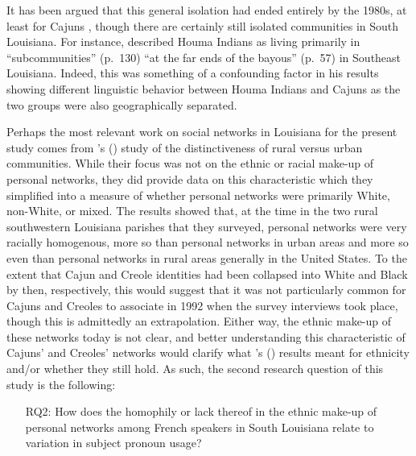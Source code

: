 \documentclass{article}\usepackage[]{graphicx}\usepackage[]{xcolor}
\begin{document}
    It has been argued that this general isolation had ended entirely by the 1980s, at least for Cajuns \parencite[Esman, 1985, as cited in][p.~25]{brown_pronominal_1988}, though there are certainly still isolated communities in South Louisiana.
    For instance, \textcite{rottet_language_1995} described Houma Indians as living primarily in ``subcommunities'' (p.~130) ``at the far ends of the bayous'' (p.~57) in Southeast Louisiana.
    Indeed, this was something of a confounding factor in his results showing different linguistic behavior between Houma Indians and Cajuns as the two groups were also geographically separated.

    Perhaps the most relevant work on social networks in Louisiana for the present study comes from \citeauthor{beggs_revisiting_1996}'s (\citeyear{beggs_revisiting_1996}) study of the distinctiveness of rural versus urban communities.
    While their focus was not on the ethnic or racial make-up of personal networks, they did provide data on this characteristic which they simplified into a measure of whether personal networks were primarily White, non-White, or mixed.
    The results showed that, at the time in the two rural southwestern Louisiana parishes that they surveyed, personal networks were very racially homogenous, more so than personal networks in urban areas and more so even than personal networks in rural areas generally in the United States.
    To the extent that Cajun and Creole identities had been collapsed into White and Black by then, respectively, this would suggest that it was not particularly common for Cajuns and Creoles to associate in 1992 when the survey interviews took place, though this is admittedly an extrapolation.
    Either way, the ethnic make-up of these networks today is not clear, and better understanding this characteristic of Cajuns' and Creoles' networks would clarify what \citeauthor{beggs_revisiting_1996}'s (\citeyear{beggs_revisiting_1996}) results meant for ethnicity and/or whether they still hold.
    As such, the second research question of this study is the following:
    \begin{itemize}
      \item[RQ2:] How does the homophily or lack thereof in the ethnic make-up of personal networks among French speakers in South Louisiana relate to variation in subject pronoun usage?
    \end{itemize}
\end{document}
